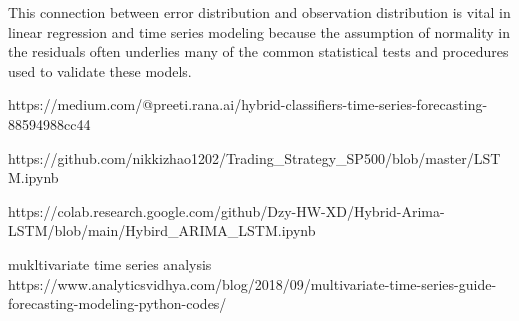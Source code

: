 This connection between error distribution and observation distribution is vital in linear regression and time series modeling because the assumption of normality in the residuals often underlies many of the common statistical tests and procedures used to validate these models.



https://medium.com/@preeti.rana.ai/hybrid-classifiers-time-series-forecasting-88594988cc44


https://github.com/nikkizhao1202/Trading_Strategy_SP500/blob/master/LSTM.ipynb


https://colab.research.google.com/github/Dzy-HW-XD/Hybrid-Arima-LSTM/blob/main/Hybird_ARIMA_LSTM.ipynb

mukltivariate time series analysis 
https://www.analyticsvidhya.com/blog/2018/09/multivariate-time-series-guide-forecasting-modeling-python-codes/
